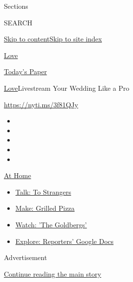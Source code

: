 Sections

SEARCH

\protect\hyperlink{site-content}{Skip to
content}\protect\hyperlink{site-index}{Skip to site index}

\href{https://www.nytimes.com/section/fashion/weddings}{Love}

\href{https://myaccount.nytimes.com/auth/login?response_type=cookie\&client_id=vi}{}

\href{https://www.nytimes.com/section/todayspaper}{Today's Paper}

\href{/section/fashion/weddings}{Love}\textbar{}Livestream Your Wedding
Like a Pro

\url{https://nyti.ms/3f81QJy}

\begin{itemize}
\item
\item
\item
\item
\item
\end{itemize}

\href{https://www.nytimes.com/spotlight/at-home?action=click\&pgtype=Article\&state=default\&region=TOP_BANNER\&context=at_home_menu}{At
Home}

\begin{itemize}
\tightlist
\item
  \href{https://www.nytimes.com/2020/08/03/well/family/the-benefits-of-talking-to-strangers.html?action=click\&pgtype=Article\&state=default\&region=TOP_BANNER\&context=at_home_menu}{Talk:
  To Strangers}
\item
  \href{https://www.nytimes.com/2020/08/01/at-home/coronavirus-make-pizza-on-a-grill.html?action=click\&pgtype=Article\&state=default\&region=TOP_BANNER\&context=at_home_menu}{Make:
  Grilled Pizza}
\item
  \href{https://www.nytimes.com/2020/07/31/arts/television/goldbergs-abc-stream.html?action=click\&pgtype=Article\&state=default\&region=TOP_BANNER\&context=at_home_menu}{Watch:
  'The Goldbergs'}
\item
  \href{https://www.nytimes.com/interactive/2020/at-home/even-more-reporters-editors-diaries-lists-recommendations.html?action=click\&pgtype=Article\&state=default\&region=TOP_BANNER\&context=at_home_menu}{Explore:
  Reporters' Google Docs}
\end{itemize}

Advertisement

\protect\hyperlink{after-top}{Continue reading the main story}

